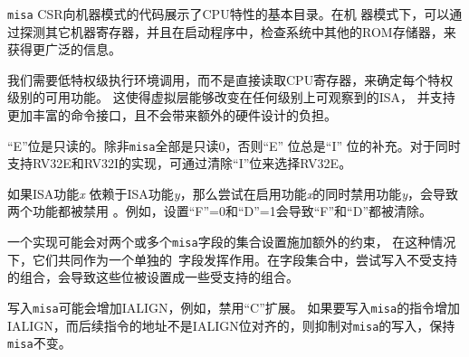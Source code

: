 {\tt misa} CSR向机器模式的代码展示了CPU特性的基本目录。在机
器模式下，可以通过探测其它机器寄存器，并且在启动程序中，检查系统中其他的ROM存储器，来获得更广泛的信息。

我们需要低特权级执行环境调用，而不是直接读取CPU寄存器，来确定每个特权级别的可用功能。
这使得虚拟层能够改变在任何级别上可观察到的ISA，
并支持更加丰富的命令接口，且不会带来额外的硬件设计的负担。

\iffalse
The ``E'' bit is read-only.  Unless {\tt misa} is all read-only zero, the ``E''
bit always reads as the complement of the ``I'' bit.  An implementation that
supports both RV32E and RV32I can select RV32E by clearing the ``I'' bit.
\fi

``E''位是只读的。除非{\tt misa}全部是只读0，否则``E'' 位总是``I'' 位的补充。对于同时支持RV32E和RV32I的实现，可通过清除``I''位来选择RV32E。

\iffalse
If an ISA feature {\em x} depends on an ISA feature {\em y}, then attempting
to enable feature {\em x} but disable feature {\em y} results in both features
being disabled.  For example, setting ``F''=0 and ``D''=1 results in both
``F'' and ``D'' being cleared.
\fi
如果ISA功能{\em x} 依赖于ISA功能{\em y}，那么尝试在启用功能{\em x}的同时禁用功能{\em y}，会导致两个功能都被禁用
。例如，设置``F''=0和``D''=1会导致``F''和``D''都被清除。

\iffalse
An implementation may impose additional constraints on the collective setting
of two or more {\tt misa} fields, in which case they function collectively as
a single \warl\ field.  An attempt to write an unsupported combination causes
those bits to be set to some supported combination.
\fi

一个实现可能会对两个或多个{\tt misa}字段的集合设置施加额外的约束，
在这种情况下，它们共同作为一个单独的\warl\ 字段发挥作用。在字段集合中，尝试写入不受支持的组合，会导致这些位被设置成一些受支持的组合。

\iffalse
Writing {\tt misa} may increase IALIGN, e.g., by disabling the ``C''
extension.
If an instruction that would write {\tt misa} increases IALIGN, and
the subsequent instruction's address is not IALIGN-bit aligned, the
write to {\tt misa} is suppressed, leaving {\tt misa} unchanged.
\fi

写入{\tt misa}可能会增加IALIGN，例如，禁用``C''扩展。
如果要写入{\tt misa}的指令增加IALIGN，而后续指令的地址不是IALIGN位对齐的，则抑制对{\tt misa}的写入，保持{\tt misa}不变。

\iffalse
When software enables an extension that was previously disabled, then all
state uniquely associated with that extension is \unspecified, unless
otherwise specified by that extension.
\fi

